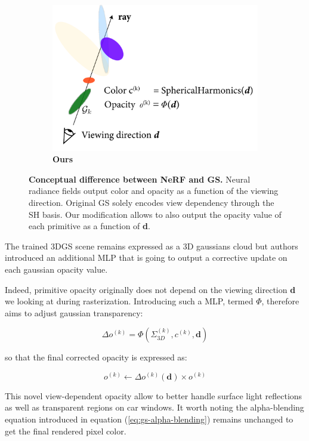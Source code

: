 \begin{figure}[htpb!]
\begin{subfigure}[b]{0.31\linewidth}
    \includegraphics[width=\linewidth]{images/gaussiansplatting/gs_NEW.png}
    \caption{\textbf{Ours}}
    \label{fig:gs-ray}
  \end{subfigure}
  \caption{\textbf{Conceptual difference between NeRF and GS.} Neural radiance fields output color and opacity as a function of the viewing direction. Original \ac{GS} solely encodes view dependency through the \ac{SH} basis. Our modification allows to also output the opacity value of each primitive as a function of \textbf{d}.}
  \label{fig:gs-nerf}
\end{figure}

The trained 3D\ac{GS} scene remains expressed as a 3D gaussians cloud but authors introduced an additional \ac{MLP} that is going to output a corrective update on each gaussian opacity value. 

Indeed, primitive opacity originally does not depend on the viewing direction \textbf{d} we looking at during rasterization. Introducing such a \ac{MLP}, termed $\Phi$, therefore aims to adjust gaussian transparency: 

\begin{equation}
\Delta o^{(k)} = \Phi(\Sigma_{3D}^{(k)},c^{(k)},\textbf{d}) 
\end{equation}

so that the final corrected opacity is expressed as: 

\begin{equation}
o^{(k)} \gets \Delta o^{(k)}(\textbf{d}) \times o^{(k)} 
\end{equation}

This novel view-dependent opacity allow to better handle surface light reflections as well as transparent regions on car windows. It worth noting the alpha-blending equation introduced in equation (\ref{eq:gs-alpha-blending}) remains unchanged to get the final rendered pixel color.

